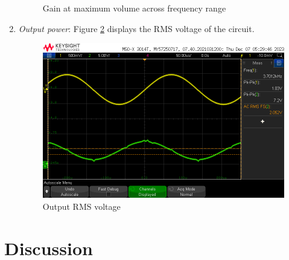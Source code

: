 \documentclass[notitlepage, 12pt]{report}
\begin{document}
\begin{enumerate}
\begin{figure}
\begin{center}
        \end{center}
        \caption{Gain at maximum volume across frequency range}
        \label{fig:ripple}
    \end{figure}
    \item \emph{Output power}: Figure \ref{fig:outputpower} displays the RMS voltage of the circuit. 
    \begin{figure}    
        \begin{center}
            \includegraphics[scale=0.4]{images/outputpower.png}  
        \end{center}
        \caption{Output RMS voltage}
        \label{fig:outputpower}
    \end{figure}
\end{enumerate}

\pagebreak

\section*{Discussion}
\end{document}
